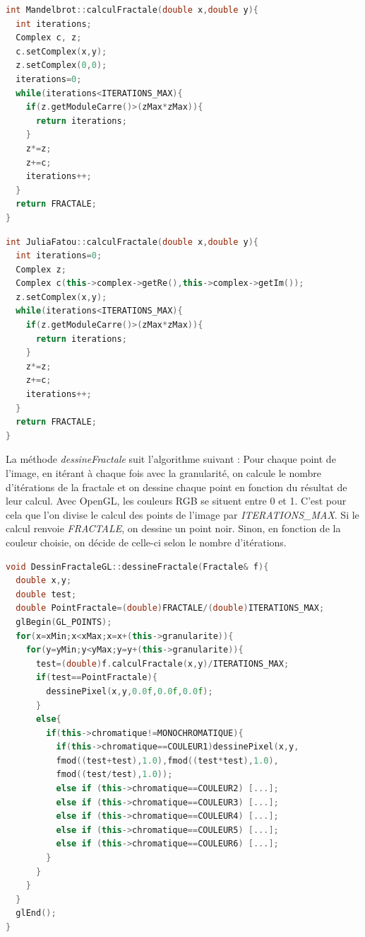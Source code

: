 \documentclass[a4]{article}
\begin{document}
\begin{lstlisting}[language=c++]
int Mandelbrot::calculFractale(double x,double y){
  int iterations;
  Complex c, z;
  c.setComplex(x,y);
  z.setComplex(0,0);
  iterations=0;
  while(iterations<ITERATIONS_MAX){
    if(z.getModuleCarre()>(zMax*zMax)){ 
      return iterations;
    }
	z*=z;
	z+=c;
	iterations++;
  }
  return FRACTALE;
}
\end{lstlisting}

\begin{lstlisting}[language=c++]
int JuliaFatou::calculFractale(double x,double y){
  int iterations=0;
  Complex z;
  Complex c(this->complex->getRe(),this->complex->getIm());
  z.setComplex(x,y);
  while(iterations<ITERATIONS_MAX){
    if(z.getModuleCarre()>(zMax*zMax)){
      return iterations;
    }
    z*=z;
    z+=c;
    iterations++;
  }
  return FRACTALE;
}
\end{lstlisting}

La méthode \emph{dessineFractale} suit l'algorithme suivant :
Pour chaque point de l'image, en itérant à chaque fois avec la granularité, on calcule le nombre d'itérations de la fractale et on dessine chaque point en fonction du résultat de leur calcul. 
Avec OpenGL, les couleurs RGB se situent entre 0 et 1. C'est pour cela que l'on divise le calcul des points de l'image par \emph{ITERATIONS\_MAX}. 
Si le calcul renvoie \emph{FRACTALE}, on dessine un point noir. Sinon, en fonction de la couleur choisie, on décide de celle-ci selon le nombre d'itérations.  

\begin{lstlisting}[language=c++]
void DessinFractaleGL::dessineFractale(Fractale& f){
  double x,y;
  double test;
  double PointFractale=(double)FRACTALE/(double)ITERATIONS_MAX;
  glBegin(GL_POINTS);
  for(x=xMin;x<xMax;x=x+(this->granularite)){
    for(y=yMin;y<yMax;y=y+(this->granularite)){ 
      test=(double)f.calculFractale(x,y)/ITERATIONS_MAX; 
      if(test==PointFractale){ 
        dessinePixel(x,y,0.0f,0.0f,0.0f);
      }
      else{
        if(this->chromatique!=MONOCHROMATIQUE){ 
          if(this->chromatique==COULEUR1)dessinePixel(x,y,
          fmod((test+test),1.0),fmod((test*test),1.0),
          fmod((test/test),1.0));
          else if (this->chromatique==COULEUR2) [...];
          else if (this->chromatique==COULEUR3) [...];
          else if (this->chromatique==COULEUR4) [...];
          else if (this->chromatique==COULEUR5) [...];
          else if (this->chromatique==COULEUR6) [...];
        }
	  }
    }
  }
  glEnd();
}
\end{lstlisting}
\end{document}
